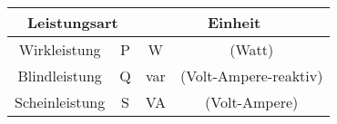 \begin{frame}
{        \begin{table}[H]
            \centering
                \begin{tabular}{  c  c  c  c }
                    \hline
                    \multicolumn{2}{c}{\bf Leistungsart} & \multicolumn{2}{c}{\bf Einheit} \\
                    \hline
                    Wirkleistung & P & W & (Watt) \\
                    Blindleistung & Q & var & (Volt-Ampere-reaktiv) \\
                    Scheinleistung & S  & VA & (Volt-Ampere) \\
                    \hline
                \end{tabular}
        \end{table}
    }
\end{frame}


